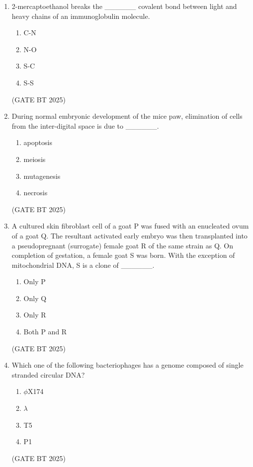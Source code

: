 \documentclass[journal,12pt,onecolumn]{IEEEtran}
\theoremstyle{remark}
\begin{document}
\begin{enumerate}
\item 
2-mercaptoethanol breaks the \_\_\_\_\_\_ covalent bond between light and heavy chains of an immunoglobulin molecule.

\begin{enumerate}
    \item C-N
    \item N-O
    \item S-C
    \item S-S
\end{enumerate}
\hfill(GATE BT 2025)

\item 
During normal embryonic development of the mice paw, elimination of cells from the inter-digital space is due to \_\_\_\_\_\_.

\begin{enumerate}
    \item apoptosis
    \item meiosis
    \item mutagenesis
    \item necrosis
\end{enumerate}
\hfill(GATE BT 2025)

\item 
A cultured skin fibroblast cell of a goat P was fused with an enucleated ovum of a goat Q. The resultant activated early embryo was then transplanted into a pseudopregnant (surrogate) female goat R of the same strain as Q. On completion of gestation, a female goat S was born. With the exception of mitochondrial DNA, S is a clone of \_\_\_\_\_\_.

\begin{enumerate}
    \item Only P
    \item Only Q
    \item Only R
    \item Both P and R
\end{enumerate}
\hfill(GATE BT 2025)

\item 
Which one of the following bacteriophages has a genome composed of single stranded circular DNA?

\begin{enumerate}
    \item $\phi$X174
    \item $\lambda$
    \item T5
    \item P1
\end{enumerate}
\hfill(GATE BT 2025)


\end{enumerate}
\end{document}
